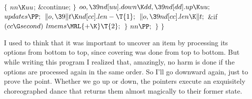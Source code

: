${}\{{}$\1\6
${}\\{nn}\K\\{uu}{}$;\5
\&{continue};\6
\4${}\}{}$\2\6
${}\\{oo},\39\\{nd}[\\{uu}].\\{down}\K\\{dd},\39\\{nd}[\\{dd}].\\{up}\K%
\\{uu};{}$\6
${}\\{updates}\PP;{}$\6
${}\|o,\39\|t\K\\{nd}[\\{cc}].\\{len}-\T{1};{}$\6
${}\|o,\39\\{nd}[\\{cc}].\\{len}\K\|t;{}$\6
\&{if} ${}(\\{cc}\G\\{second}){}$\1\5
${}\\{lmems}\MRL{+{\K}}\T{2};{}$\2\6
\4${}\}{}$\2\6
${}\\{nn}\PP;{}$\6
\4${}\}{}$\2\2\6
\4${}\}{}$\2\par
\fi

I used to think that it was important to uncover an item by
processing its options from bottom to top, since covering was done
from top to bottom. But while writing this
program I realized that, amazingly, no harm is done if the
options are processed again in the same order. So I'll go downward again,
just to prove the point. Whether we go up or down, the pointers
execute an exquisitely choreo\-graphed dance that returns them almost
magically to their former state.

